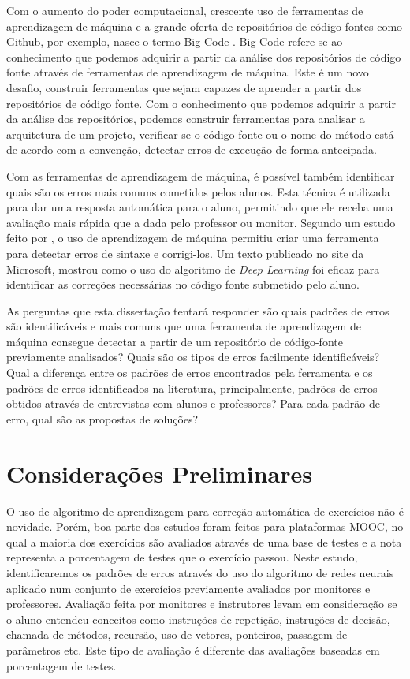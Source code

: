 Com o aumento do poder computacional, crescente uso de ferramentas de aprendizagem de máquina e a grande oferta de repositórios de código-fontes como Github, por exemplo, nasce o termo Big Code \citep{DBLP:journals/corr/BhatiaS16}. Big Code refere-se ao conhecimento que podemos adquirir a partir da análise dos repositórios de código fonte através de ferramentas de aprendizagem de máquina. Este é um novo desafio, construir ferramentas que sejam capazes de aprender a partir dos repositórios de código fonte. Com o conhecimento que podemos adquirir a partir da análise dos repositórios, podemos construir ferramentas para analisar a arquitetura de um projeto, verificar se o código fonte ou o nome do método está de acordo com a convenção, detectar erros de execução de forma antecipada.

Com as ferramentas de aprendizagem de máquina, é possível também identificar quais são os erros mais comuns cometidos pelos alunos. Esta técnica é utilizada para dar uma resposta automática para o aluno, permitindo que ele receba uma avaliação mais rápida que a dada pelo professor ou monitor. Segundo um estudo feito por \cite{DBLP:journals/corr/BhatiaS16}, o uso de aprendizagem de máquina permitiu criar uma ferramenta para detectar erros de sintaxe e corrigi-los. Um texto publicado no site da Microsoft, mostrou como o uso do algoritmo de \textit{Deep Learning} foi eficaz para identificar as correções necessárias no código fonte submetido pelo aluno.

As perguntas que esta dissertação tentará responder são quais padrões de erros são identificáveis e mais comuns que uma ferramenta de aprendizagem de máquina consegue detectar a partir de um repositório de código-fonte previamente analisados? Quais são os tipos de erros facilmente identificáveis? Qual a diferença entre os padrões de erros encontrados pela ferramenta e os padrões de erros identificados na literatura, principalmente, padrões de erros obtidos através de entrevistas com alunos e professores? Para cada padrão de erro, qual são as propostas de soluções?


\section{Considerações Preliminares}
\label{sec:consideracoes_preliminares}

O uso de algoritmo de aprendizagem para correção automática de exercícios não é novidade. Porém, boa parte dos estudos foram feitos para plataformas MOOC, no qual a maioria dos exercícios são avaliados através de uma base de testes e a nota representa a porcentagem de testes que o exercício passou. Neste estudo, identificaremos os padrões de erros através do uso do algoritmo de redes neurais aplicado num conjunto de exercícios previamente avaliados por monitores e professores. Avaliação feita por monitores e instrutores levam em consideração se o aluno entendeu conceitos como instruções de repetição, instruções de decisão, chamada de métodos, recursão, uso de vetores, ponteiros, passagem de parâmetros etc. Este tipo de avaliação é diferente das avaliações baseadas em porcentagem de testes.

